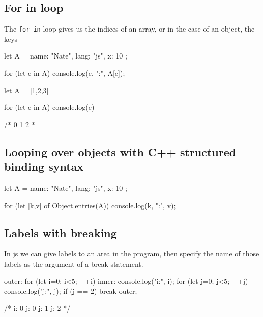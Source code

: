 \documentclass{report}
\begin{document}
    \bigbreak \noindent 
    \subsection{For in loop}
    \bigbreak \noindent 
    The \texttt{for in} loop gives us the indices of an array, or in the case of an object, the keys
    \bigbreak \noindent 
    \begin{jscode}
        let A = {
            name: "Nate",
            lang: "js",
            x: 10
        };

        for (let e in A) {
            console.log(e, ":", A[e]);
        }
    \end{jscode}

    \bigbreak \noindent 
    \begin{jscode}
        let A = [1,2,3]

        for (let e in A) {
            console.log(e)
        }

        /*
        0
        1
        2
        *
    \end{jscode}

    \bigbreak \noindent 
    \subsection{Looping over objects with C++ structured binding syntax}
    \bigbreak \noindent 
    \begin{jscode}
        let A = {
            name: "Nate",
            lang: "js",
            x: 10
        };


        for (let [k,v] of Object.entries(A)) {
            console.log(k, ":", v);
        }
    \end{jscode}

    \bigbreak \noindent 
    \subsection{Labels with breaking}
    \bigbreak \noindent 
    In js we can give labels to an area in the program, then specify the name of those labels as the argument of a break statement. 
    \bigbreak \noindent 
    \begin{jscode}
        outer:
        for (let i=0; i<5; ++i) {
            inner:
            console.log("i:", i);
            for (let j=0; j<5; ++j) {
                console.log("j:", j);
                if (j == 2) break outer;
            }
        }

        /* 
        i: 0
        j: 0
        j: 1
        j: 2
        */
    \end{jscode}
\end{document}

